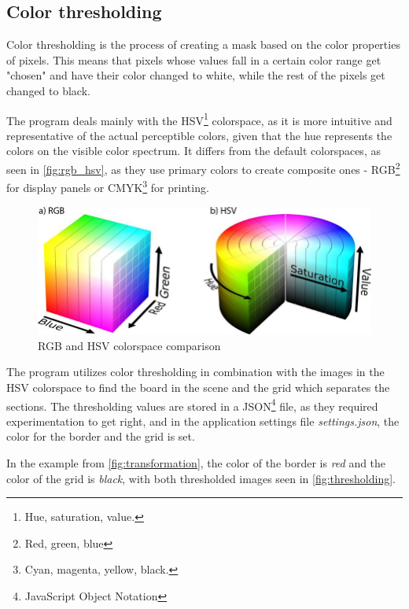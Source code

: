 \documentclass[12pt]{report}
\theoremstyle{definition}
\theoremstyle{remark}
\begin{document}
\subsection{Color thresholding} 
Color thresholding is the process of creating a mask based on the color properties of pixels. This means that pixels whose values fall in a certain color range get "chosen" and have their color changed to white, while the rest of the pixels get changed to black. 

The program deals mainly with the HSV\footnote{Hue, saturation, value.} colorspace, as it is more intuitive and representative of the actual perceptible colors, given that the hue represents the colors on the visible color spectrum. It differs from the default colorspaces, as seen in \autoref{fig:rgb_hsv}, as they use primary colors to create composite ones - RGB\footnote{Red, green, blue} for display panels or CMYK\footnote{Cyan, magenta, yellow, black.} for printing.

\begin{figure}
    \centering
    \includegraphics[width=\textwidth]{img/rgb_hsv.png}
    \caption{RGB and HSV colorspace comparison}
    \label{fig:rgb_hsv}
\end{figure}
The program utilizes color thresholding in combination with the images in the HSV colorspace to find the board in the scene and the grid which separates the sections. The thresholding values are stored in a JSON\footnote{JavaScript Object Notation} file, as they required experimentation to get right, and in the application settings file \textit{settings.json}, the color for the border and the grid is set. 

In the example from \autoref{fig:transformation}, the color of the border is \textit{red} and the color of the grid is \textit{black}, with both thresholded images seen in \autoref{fig:thresholding}.
\end{document}
